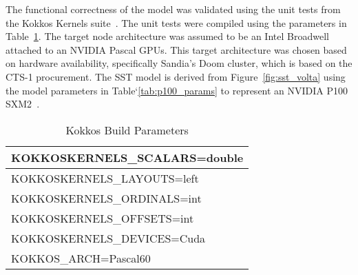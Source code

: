 The functional correctness of the model was validated using the unit tests from
the Kokkos Kernels suite~\cite{kokkos_kernels}. The unit tests were compiled
using the parameters in Table~\ref{tab:kokkos_build}. The target node
architecture was assumed to be an Intel Broadwell attached to an NVIDIA Pascal
GPUs. This target architecture was chosen based on hardware availability,
specifically Sandia's Doom cluster, which is based on the CTS-1
procurement. The SST model is derived from Figure~\ref{fig:sst_volta} using the
model parameters in Table`\ref{tab:p100_params} to represent an NVIDIA P100
SXM2~\cite{p100}.

    \begin{table}[!htbp]
        \centering
        \setlength{\abovecaptionskip}{6pt plus 1pt minus 1pt}
        \captionsetup{width=.75\textwidth}
        \caption{Kokkos Build Parameters}
        \begin{tabular}{|l|}
            \hline
            KOKKOSKERNELS\_SCALARS=double          \\ \hline
            KOKKOSKERNELS\_LAYOUTS=left            \\ \hline
            KOKKOSKERNELS\_ORDINALS=int            \\ \hline
            KOKKOSKERNELS\_OFFSETS=int             \\ \hline
            KOKKOSKERNELS\_DEVICES=Cuda     	   \\ \hline
            KOKKOS\_ARCH=Pascal60              	   \\ \hline
         \end{tabular}
        \label{tab:kokkos_build}
    \end{table}

